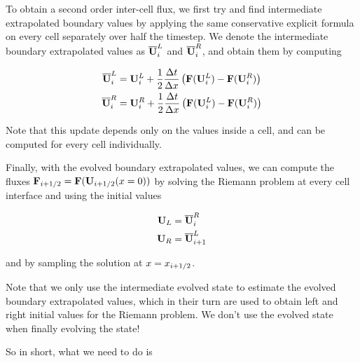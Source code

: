 To obtain a second order inter-cell flux, we first try and find intermediate
extrapolated boundary values by applying the same conservative explicit formula
on every cell separately over half the timestep. We denote the intermediate
boundary extrapolated values as $\overline{\mathbf{U}}_i^L$ and $\overline{\mathbf{U}}_i^R$,
and obtain them by computing

\begin{align}
\overline{\mathbf{U}}_i^L &=
\mathbf{U}_i^L +
\frac{1}{2} \frac{\Delta t}{\Delta x}
\left(
	\mathbf{F}(\mathbf{U}_i^L) - \mathbf{F}(\mathbf{U}_i^R)
\right)
\\
\overline{\mathbf{U}}_i^R &=
	\mathbf{U}_i^R +
	\frac{1}{2} \frac{\Delta t}{\Delta x}
	\left(
		\mathbf{F}(\mathbf{U}_i^L) - \mathbf{F}(\mathbf{U}_i^R)
	\right)
\end{align}

Note that this update depends only on the values inside a cell, and can be
computed for every cell individually.

Finally, with the evolved boundary extrapolated values, we can compute the
fluxes $\mathbf{F}_{i + 1/2} = \mathbf{F}(\mathbf{U}_{i+1/2}(x = 0))$ by solving the Riemann
problem at every cell interface and using the initial values

\begin{align}
	\mathbf{U}_L &= \overline{\mathbf{U}}_i^R\\
	\mathbf{U}_R &= \overline{\mathbf{U}}_{i+1}^L 
\end{align}

and by sampling the solution at $ x = x_{i+1/2}$.


Note that we only use the intermediate evolved state to estimate the evolved
boundary extrapolated values, which in their turn are used to obtain left and
right initial values for the Riemann problem. We don't use the evolved state
when finally evolving the state!

So in short, what we need to do is

